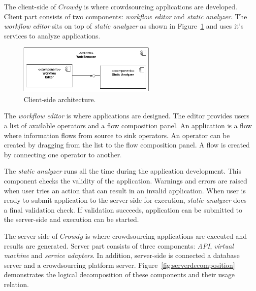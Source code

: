 
The client-side of $Crowdy$ is where crowdsourcing applications are developed. Client 
part consists of two components: \textit{workflow editor} and \textit{static analyzer}. The 
\textit{workflow editor} sits on top of \textit{static analyzer} as shown in 
Figure~\ref{fig:clientdecomposition} and uses it's services to analyze applications.

\begin{figure}[ht]
	\centering
	\includegraphics[width=0.6\textwidth]{figures/architecture/CC2.png}
	\caption{Client-side architecture.}
	\label{fig:clientdecomposition}
\end{figure}

The \textit{workflow editor} is where applications are designed. The editor provides 
users a list of available operators and a flow composition panel. An application is 
a flow where information flows from source to sink operators. An operator can be 
created by dragging from the list to the flow composition panel. A flow is created by 
connecting one operator to another.

The \textit{static analyzer} runs all the time during the application development. This 
component checks the validity of the application. Warnings and errors are raised 
when user tries an action that can result in an invalid application. When user is 
ready to submit application to the server-side for execution, \textit{static analyzer} 
does a final validation check. If validation succeeds, application can be submitted 
to the server-side and execution can be started.

The server-side of $Crowdy$ is where crowdsourcing applications are executed and 
results are generated. Server part consists of three components: \textit{API}, 
\textit{virtual machine} and \textit{service adapters}. In addition, server-side 
is connected a database server and a crowdsourcing platform server. 
Figure~\ref{fig:serverdecomposition} demonstrates the logical decomposition of these 
components and their usage relation.

